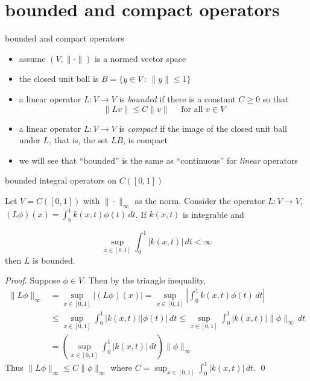 \documentclass[10pt,
               svgnames,
               hyperref={colorlinks,
                         citecolor=DeepPink4,
                         linkcolor=FireBrick,
                         urlcolor=Maroon},
               usepdftitle=false]{beamer}
\newcommand{\ds}{\displaystyle}
\begin{document}
\section{bounded and compact operators}

\begin{frame}{bounded and compact operators}

\begin{itemize}
\item assume $(V,\|\cdot\|)$ is a normed vector space
\item the closed unit ball is $B =\{y\in V\,:\,\|y\| \le 1\}$
\end{itemize}

\begin{definition}
\begin{itemize}
\item a linear operator $L:V \to V$ is \emph{bounded} if there is a constant $C\ge 0$ so that
    $$\|Lv\|\le C \|v\| \quad \text{ for all } v\in V$$
\item a linear operator $L:V \to V$ is \emph{compact} if the image of the closed unit ball under $L$, that is, the set $LB$, is compact
\end{itemize}
\end{definition}

\begin{itemize}
\item we will see that ``bounded'' is the same as ``continuous'' for \emph{linear} operators
\end{itemize}

\end{frame}


\begin{frame}{bounded integral operators on $C([0,1])$}

\begin{theorem}
Let $V=C([0,1])$ with $\|\cdot\|_\infty$ as the norm.  Consider the operator $L:V\to V$, \, $\ds (L\phi)(x) = \int_0^1 k(x,t) \phi(t)\,dt$.  If $k(x,t)$ is integrable and

    $$\sup_{x \in [0,1]} \int_0^1 |k(x,t)|\,dt<\infty$$
then $L$ is bounded.
\end{theorem}

{\footnotesize
\noindent \emph{Proof.}  Suppose $\phi \in V$.  Then by the triangle inequality,
\begin{align*}
\|L\phi\|_\infty &= \sup_{x \in [0,1]} |(L\phi)(x)| = \sup_{x \in [0,1]} \left|\int_0^1 k(x,t) \phi(t)\,dt \right| \\
   &\le \sup_{x \in [0,1]} \int_0^1 |k(x,t)| |\phi(t)|\,dt \le \sup_{x \in [0,1]} \int_0^1 |k(x,t)| \|\phi\|_\infty \,dt \\
   &= \left(\sup_{x \in [0,1]} \int_0^1 |k(x,t)| \,dt\right)\|\phi\|_\infty
\end{align*}
Thus $\|L\phi\|_\infty \le C \|\phi\|_\infty$ where $C=\sup_{x \in [0,1]} \int_0^1 |k(x,t)| \,dt$. \hfill \qed
}

\end{frame}
\end{document}
